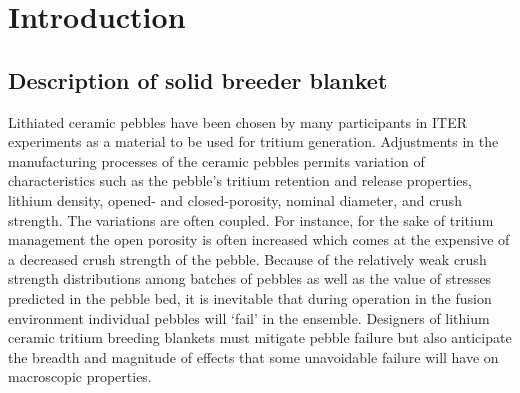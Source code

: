 \chapter{Introduction} \label{intro}
\section{Description of solid breeder blanket}
Lithiated ceramic pebbles have been chosen by many participants in ITER experiments as a material to be used for tritium generation\cite{Lulewicz2002, Mandal2012a, Tsuchiya1998, Cho2012}. Adjustments in the manufacturing processes of the ceramic pebbles permits variation of characteristics such as the pebble's tritium retention and release properties, lithium density, opened- and closed-porosity, nominal diameter, and crush strength. The variations are often coupled. For instance, for the sake of tritium management the open porosity is often increased which comes at the expensive of a decreased crush strength of the pebble. Because of the relatively weak crush strength distributions among batches of pebbles as well as the value of stresses predicted in the pebble bed, it is inevitable that during operation in the fusion environment individual pebbles will `fail' in the ensemble. Designers of lithium ceramic tritium breeding blankets must mitigate pebble failure but also anticipate the breadth and magnitude of effects that some unavoidable failure will have on macroscopic properties.


